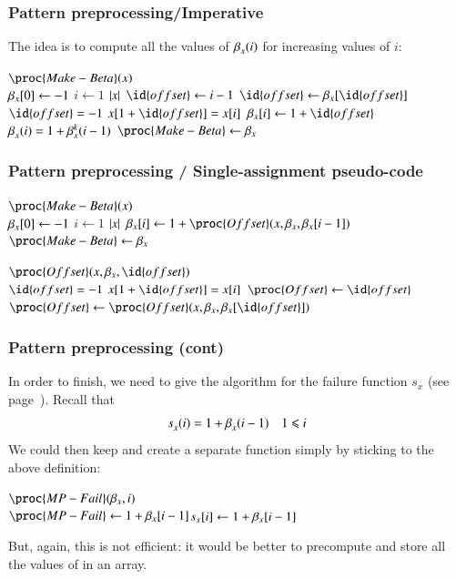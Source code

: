 %
\begin{frame}
\frametitle{Pattern preprocessing/Imperative}

The idea is to compute all the values of \(\beta_{x}^{}(i)\) for
increasing values of \(i\):
\begin{codebox}
\(\proc{Make-Beta}(x)\)\\
\li \(\beta_{x}[0] \gets -1\)
\li \For \(i \gets 1\) \To \(\lvert{x}\lvert{}\)
\li	\Do \(\id{offset} \gets i-1\)
\li     \Repeat
\li       \(\id{offset} \gets \MPsupplyName_{x}[\id{offset}]\)
\li     \Until \(\id{offset} = -1\) \LogOr \(x[1+\id{offset}] = x[i]\)
\li     \(\MPsupplyName_{x}[i] \gets 1 + \id{offset}\)\RComment \(\beta_{x}^{}(i)
= 1+\beta_{x}^{k}(i-1)\)
    \End
\li \(\proc{Make-Beta} \gets \MPsupplyName_{x}\)
\end{codebox}

\end{frame}

%
\begin{frame}
\frametitle{Pattern preprocessing /
  Single-assignment pseudo-code}

\begin{codebox}
\(\proc{Make-Beta}(x)\)\\
\li \(\beta_{x}[0] \gets -1\)
\li \For \(i \gets 1\) \To \(\lvert{x}\lvert{}\)
\li	\Do \(\MPsupplyName_{x}[i] \gets 1 + \proc{Offset} (x, \MPsupplyName_{x}, \MPsupplyName_{x}[i-1])\)
    \End
\li \(\proc{Make-Beta} \gets \MPsupplyName_{x}\)
\end{codebox}
\begin{codebox}
\(\proc{Offset}(x, \MPsupplyName_{x}, \id{offset})\)\\
\li \If \(\id{offset} = -1\) \LogOr \(x[1+\id{offset}] = x[i]\)
\li \Then \(\proc{Offset} \gets \id{offset}\)
\li \Else \(\proc{Offset} \gets \proc{Offset} (x, \MPsupplyName_{x},
          \MPsupplyName_{x}[\id{offset}])\)
    \End
\end{codebox}

\end{frame}

%
\begin{frame}
\frametitle{Pattern preprocessing (cont)}

In order to finish, we need to give the algorithm for the failure
function \(s_{x}\) (see page~\pageref{supply}). Recall that
\[
s_{x}^{}(i) = 1 + \beta_{x}^{}(i-1) \quad 1 \leqslant i
\]
We could then keep  and create a separate function
 simply by sticking to the above definition:
\begin{codebox}
\(\proc{MP-Fail} (\MPsupplyName_{x}, i)\)\\
\li \(\proc{MP-Fail} \gets 1 + \MPsupplyName_{x}[i-1]\)\>\>\>\>\>\>\>\>\Comment \(s_{x}[i] \gets 1 + \beta_{x}[i-1]\)
\end{codebox}
But, again, this is not efficient: it would be better to precompute
and store all the values of  in an array.

\end{frame}

